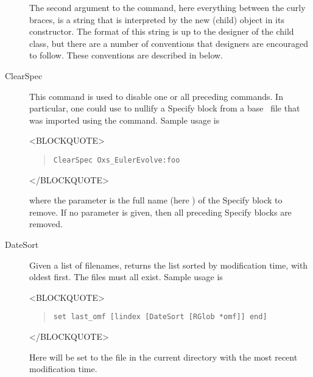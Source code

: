 \begin{description}
The second argument to the  command, here everything between
the curly braces, is a string that is interpreted by the new
 (child) object in its constructor.  The format of this
string is up to the designer of the child class, but there are a number
of conventions that designers are encouraged to follow.  These
conventions are described in
 below.

\item[ClearSpec]
This command is used to disable one or all preceding 
commands.  In particular, one could use  to nullify a
Specify block from a base \MIF\ file that was imported using the
 command.  Sample usage is
\begin{rawhtml}
<BLOCKQUOTE>
\end{rawhtml}
\begin{quote}
\begin{verbatim}
ClearSpec Oxs_EulerEvolve:foo
\end{verbatim}
\end{quote}
\begin{rawhtml}
</BLOCKQUOTE>
\end{rawhtml}
where the parameter is the full name (here ) of
the Specify block to remove.  If no parameter is given, then all
preceding Specify blocks are removed.

\item[DateSort]
Given a list of filenames, returns the list sorted by modification
time, with oldest first. The files must all exist. Sample usage is
\begin{rawhtml}
  <BLOCKQUOTE>
\end{rawhtml}
\begin{quote}
\begin{verbatim}
set last_omf [lindex [DateSort [RGlob *omf]] end]
\end{verbatim}
\end{quote}
\begin{rawhtml}
  </BLOCKQUOTE>
\end{rawhtml}
Here  will be set to the  file in the current
directory with the most recent modification time.


\end{description}

